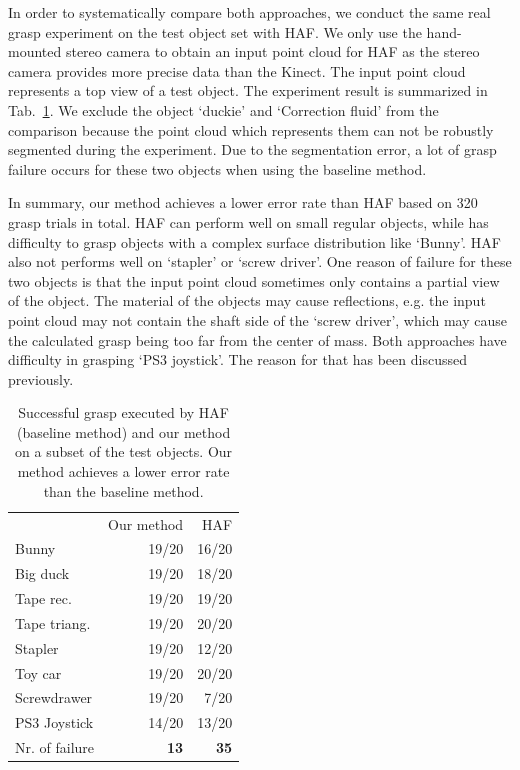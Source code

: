 In order to systematically compare both approaches, we conduct the same real grasp experiment on the test object set with HAF. We only use the hand-mounted stereo camera to obtain an input point cloud for HAF as the stereo camera provides more precise data than the Kinect. The input point cloud represents a top view of a test object. The experiment result is summarized in Tab.~\ref{tab:baseline_compare}. 
We exclude the object `duckie' and `Correction fluid' from the comparison because the point cloud which represents them can not be robustly segmented during the experiment. Due to the segmentation error, a lot of grasp failure occurs for these two objects when using the baseline method. 

In summary, our method achieves a lower error rate than HAF based on 320 grasp trials in total. HAF can perform well on small regular objects, while has difficulty to grasp objects with a complex surface distribution like `Bunny'. HAF also not performs well on `stapler' or `screw driver'. One reason of failure for these two objects is that the input point cloud sometimes only contains a partial view of the object. The material of the objects may cause reflections, e.g. the input point cloud may not contain the shaft side of the `screw driver', which may cause the calculated grasp being too far from the center of mass. Both approaches have difficulty in grasping `PS3 joystick'. The reason for that has been discussed previously.
\begin{table}[!htb]
\centering
\begin{tabular}{lrr}
               & Our method & HAF   \\
Bunny          & 19/20      & 16/20 \\
Big duck       & 19/20      & 18/20 \\
Tape rec.      & 19/20      & 19/20 \\
Tape triang.   & 19/20      & 20/20 \\
Stapler        & 19/20      & 12/20 \\
Toy car        & 19/20      & 20/20 \\
Screwdrawer    & 19/20      & 7/20  \\
PS3 Joystick   & 14/20      & 13/20 \\
Nr. of failure & \textbf{13}         & \textbf{35}   
\end{tabular}
\caption{Successful grasp executed by HAF (baseline method) and our method on a subset of the test objects. Our method achieves a lower error rate than the baseline method.}
\label{tab:baseline_compare}
\end{table}


